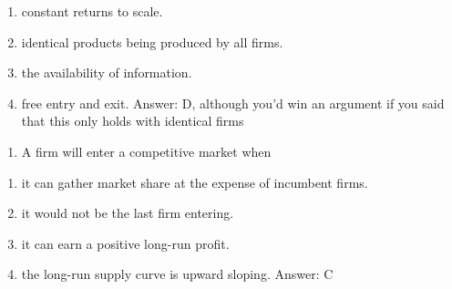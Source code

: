 \documentclass[11pt,]{article}
\providecommand{\tightlist}{%
  \setlength{\itemsep}{0pt}\setlength{\parskip}{0pt}}
\begin{document}
\begin{enumerate}
\def\labelenumi{\Alph{enumi})}
\tightlist
\item
  constant returns to scale.
\item
  identical products being produced by all firms.
\item
  the availability of information.
\item
  free entry and exit. Answer: D, although you'd win an argument if you
  said that this only holds with identical firms
\end{enumerate}

\begin{enumerate}
\def\labelenumi{\arabic{enumi})}
\setcounter{enumi}{19}
\tightlist
\item
  A firm will enter a competitive market when
\end{enumerate}

\begin{enumerate}
\def\labelenumi{\Alph{enumi})}
\tightlist
\item
  it can gather market share at the expense of incumbent firms.
\item
  it would not be the last firm entering.
\item
  it can earn a positive long-run profit.
\item
  the long-run supply curve is upward sloping. Answer: C
\end{enumerate}
\end{document}
